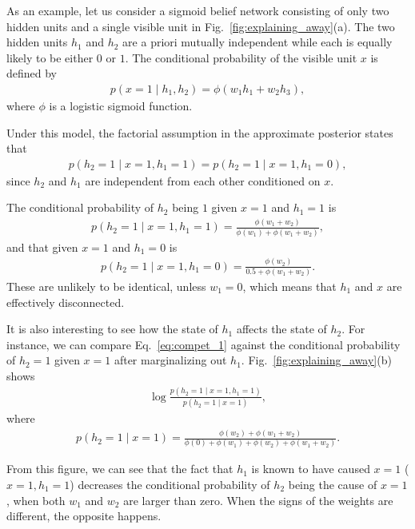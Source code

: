 \documentclass[dissertation,nocontribution,draft*]{aaltoseries}
\begin{document}
As an example, let us consider a sigmoid belief network
consisting of only two hidden units and a single visible
unit in Fig.~\ref{fig:explaining_away}(a). The two hidden
units $h_1$ and $h_2$ are a priori mutually independent
while each is equally likely to be either $0$ or $1$. The
conditional probability of the visible unit $x$ is defined
by 
\begin{align*}
    p(x = 1 \mid h_1, h_2) = \phi(w_1 h_1 + w_2 h_3),
\end{align*}
where $\phi$ is a logistic sigmoid function.

Under this model, the factorial assumption in the
approximate posterior states that 
\begin{align}
    \label{eq:cond_ind}
    p(h_2 = 1 \mid x = 1, h_1 = 1) = p(h_2 = 1 \mid x = 1,
    h_1 = 0),
\end{align}
since $h_2$ and $h_1$ are independent from each other
conditioned on $x$. 

The conditional probability of $h_2$ being $1$ given $x=1$
and $h_1=1$ is 
\begin{align}
    \label{eq:compet_1}
    p(h_2 = 1 \mid x=1, h_1=1) = \frac{\phi(w_1 +
    w_2)}{\phi(w_1) + \phi(w_1 + w_2)},
\end{align}
and that given $x=1$ and $h_1=0$ is
\begin{align}
    \label{eq:compet_2}
    p(h_2 = 1 \mid x = 1, h_1 =0) = \frac{\phi(w_2)}{0.5 +
    \phi(w_1 + w_2)}.
\end{align}
These are unlikely to be identical, unless $w_1=0$, which
means that $h_1$ and $x$ are effectively disconnected. 

It is also interesting to see how the state of $h_1$ affects
the state of $h_2$. For instance, we can compare
Eq.~\eqref{eq:compet_1} against the conditional probability
of $h_2=1$ given $x=1$ after marginalizing out $h_1$.
Fig.~\ref{fig:explaining_away}(b) shows 
\begin{align*}
    \log\frac{p(h_2 = 1 \mid x=1, h_1 = 1)}{p(h_2=1 \mid
    x=1)},
\end{align*}
where
\begin{align*}
    p(h_2 = 1 \mid x = 1) = \frac{\phi(w_2) +
    \phi(w_1+w_2)}{\phi(0) + \phi(w_1) + \phi(w_2) +
    \phi(w_1+w_2)}.
\end{align*}

From this figure, we can see that the fact that $h_1$ is
known to have caused $x=1$ ($x=1,h_1=1$) decreases the
conditional probability of $h_2$ being the cause of $x=1$,
when both $w_1$ and $w_2$ are larger than zero. When the
signs of the weights are different, the opposite happens.
\end{document}
